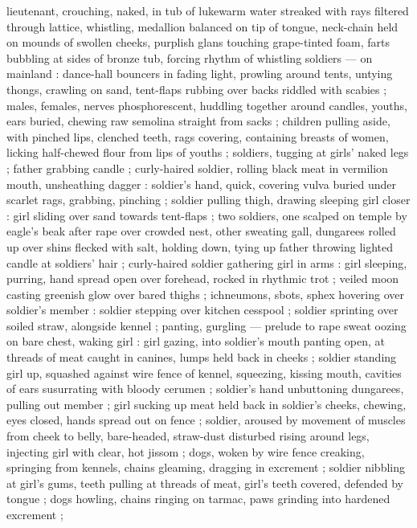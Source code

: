 lieutenant, crouching, naked, in tub of lukewarm water streaked with rays filtered through lattice,
whistling, medallion balanced on tip of tongue, neck-chain held on mounds of swollen cheeks,
purplish glans touching grape-tinted foam, farts bubbling at sides of bronze tub, forcing rhythm of
whistling {\semislash} soldiers --- on mainland : dance-hall bouncers {\dashcom} in fading light,
prowling around tents, untying thongs, crawling on sand, tent-flaps rubbing over backs riddled with
scabies ; males, females, nerves phosphorescent, huddling together around candles, youths, ears
buried, chewing raw semolina straight from sacks ; children pulling aside, with pinched lips,
clenched teeth, rags covering, containing breasts of women, licking half-chewed flour from lips of
youths ; soldiers, tugging at girls' naked legs ; father grabbing candle ; curly-haired soldier,
rolling black meat in vermilion mouth, unsheathing dagger : soldier's hand, quick, covering vulva
buried under scarlet rags, grabbing, pinching ; soldier pulling thigh, drawing sleeping girl %
closer : girl sliding over sand towards tent-flaps ; two soldiers, one scalped on temple by eagle's
beak after rape over crowded nest, other sweating gall, dungarees rolled up over shins flecked with
salt, holding down, tying up father throwing lighted candle at soldiers' hair ; curly-haired soldier
gathering girl in arms : girl sleeping, purring, hand spread open over forehead, rocked in rhythmic
trot ; veiled moon casting greenish glow over bared thighs ; ichneumons, sbots, sphex hovering over
soldier's member : soldier stepping over kitchen cesspool ; soldier sprinting over soiled straw,
alongside kennel ; panting, gurgling --- prelude to rape {\dashcom} sweat oozing on bare chest,
waking girl : girl gazing, into soldier's mouth panting open, at threads of meat caught in canines,
lumps held back in cheeks ; soldier standing girl up, squashed against wire fence of kennel,
squeezing, kissing mouth, cavities of ears susurrating with bloody cerumen ; soldier's hand
unbuttoning dungarees, pulling out member ; girl sucking up meat held back in soldier's cheeks,
chewing, eyes closed, hands spread out on fence ; soldier, aroused by movement of muscles from cheek
to belly, bare-headed, straw-dust disturbed rising around legs, injecting girl with clear, hot
jissom ; dogs, woken by wire fence creaking, springing from kennels, chains gleaming, dragging in
excrement ; soldier nibbling at girl's gums, teeth pulling at threads of meat, girl's teeth covered,
defended by tongue ; dogs howling, chains ringing on tarmac, paws grinding into hardened excrement ;
